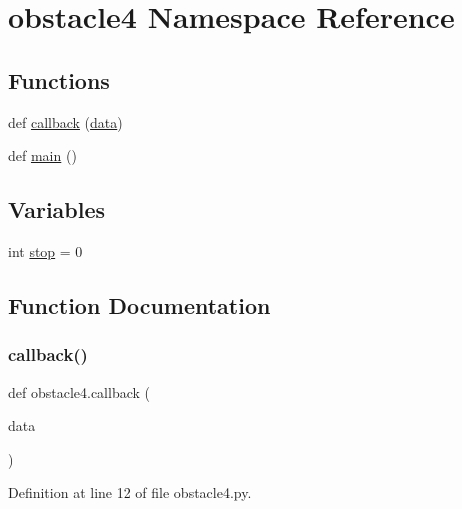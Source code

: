 \hypertarget{namespaceobstacle4}{}\section{obstacle4 Namespace Reference}
\label{namespaceobstacle4}
\subsection*{Functions}
\begin{DoxyCompactItemize}
\item 
def \mbox{\hyperlink{namespaceobstacle4_a7c1ad0a389dc7435da6d4e6e06ed1c1c}{callback}} (\mbox{\hyperlink{structdata}{data}})
\item 
def \mbox{\hyperlink{namespaceobstacle4_ade5f82a1dc1b9444b04356a62c982a30}{main}} ()
\end{DoxyCompactItemize}
\subsection*{Variables}
\begin{DoxyCompactItemize}
\item 
int \mbox{\hyperlink{namespaceobstacle4_a963efb21ed8c95168d4ad982ce3745ca}{stop}} = 0
\end{DoxyCompactItemize}


\subsection{Function Documentation}
\mbox{\label{namespaceobstacle4_a7c1ad0a389dc7435da6d4e6e06ed1c1c}} 
\subsubsection{\texorpdfstring{callback()}{callback()}}
{\footnotesize\ttfamily def obstacle4.\+callback (\begin{DoxyParamCaption}\item[{}]{data }\end{DoxyParamCaption})}



Definition at line 12 of file obstacle4.\+py.

\mbox{\label{namespaceobstacle4_ade5f82a1dc1b9444b04356a62c982a30}} 
